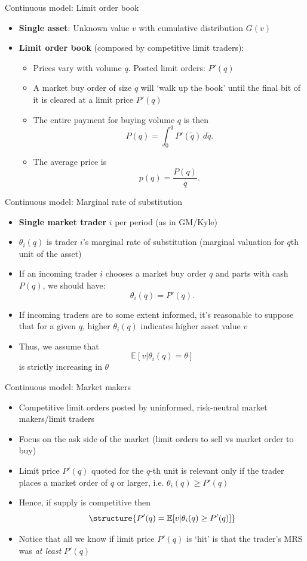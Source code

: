 \documentclass[english,10pt]{beamer}
\begin{document}
\begin{frame}{Continuous model: Limit order book}
\begin{itemize}
	\item \textbf{Single asset}: Unknown value $v$ with cumulative distribution  $G(v)$
	\item \textbf{Limit order book} (composed by competitive limit traders): 
	\begin{itemize}
		\item Prices vary with volume $q$. Posted limit orders: $P'(q)$
		\item A market buy order of size $q$ will `walk up the book' until the final bit of it is cleared at a limit price $P'(q)$
		\item The entire payment for buying volume $q$ is then
		\[
		P(q) = \int_0^q P'(\tilde{q}) \, d\tilde{q}.
		\]
		\item The average price is 
		\[
		p(q) = \frac{P(q)}{q}.
		\]
	\end{itemize}
\end{itemize}
\end{frame}


\begin{frame}{Continuous model: Marginal rate of substitution}
	\begin{itemize}
		\item \textbf{Single market trader} $i$ per period (as in GM/Kyle)
		\item $\theta_i(q)$ is trader $i$'s marginal rate of substitution (marginal valuation for $q$th unit of the asset)
		\item If an incoming trader $i$ chooses a market buy order $q$ and parts with cash $P(q)$, we should have: \[\theta_i(q) = P'(q).\]
		\item If incoming traders are to some extent informed, it's reasonable to suppose that for a given $q$, higher $\theta_i(q)$ indicates higher asset value $v$
		\item Thus, we assume that 
		\[
		\mathbb{E}[v|\theta_i(q) = \theta]
		\]
		is strictly increasing in $\theta$
	\end{itemize}
\end{frame}


\begin{frame}{Continuous model: Market makers}
	\begin{itemize}	
		\item Competitive limit orders posted by uninformed, risk-neutral market makers/limit traders
		\item Focus on the ask side of the market (limit orders to sell vs market order to buy)
		\item Limit price $P'(q)$ quoted for the $q$-th unit is relevant only if the trader places a market order of $q$ or larger, i.e. $\theta_i(q) \geq P'(q)$
		\item Hence, if supply is competitive then
		\[
		\structure{P'(q) = \mathbb{E}[v|\theta_i(q) \geq P'(q)]}
		\]
		\item Notice that all we know if limit price $P'(q)$ is `hit' is that the trader's MRS was \textit{at least} $P'(q)$
	\end{itemize}
\end{frame}
\end{document}
